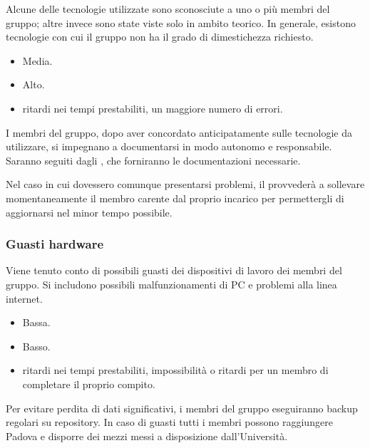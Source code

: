 \documentclass[a4paper, titlepage]{article}
\begin{document}
	Alcune delle tecnologie utilizzate sono sconosciute a uno o più membri del gruppo; altre invece sono state viste solo in ambito teorico. In generale, esistono tecnologie con cui il gruppo non ha il grado di dimestichezza richiesto.
	
	\begin{itemize}
		\item {} Media.
		\item {} Alto.
		\item {} ritardi nei tempi prestabiliti, un maggiore numero di errori.
	\end{itemize}
	
	I membri del gruppo, dopo aver concordato anticipatamente sulle tecnologie da utilizzare, si impegnano a documentarsi in modo autonomo e responsabile. Saranno seguiti dagli , che forniranno le documentazioni necessarie.
	
	 Nel caso in cui dovessero comunque presentarsi problemi, il  provvederà a sollevare momentaneamente il membro carente dal proprio incarico per permettergli di aggiornarsi nel minor tempo possibile. 
	
	
	\subsubsection{Guasti hardware}
	Viene tenuto conto di possibili guasti dei dispositivi di lavoro dei membri del gruppo. Si includono possibili malfunzionamenti di PC e problemi alla linea internet.
	
	\begin{itemize}
		\item {} Bassa.
		\item {} Basso.
		\item {} ritardi nei tempi prestabiliti, impossibilità o ritardi per un membro di completare il proprio compito.
	\end{itemize}
	
	Per evitare perdita di dati significativi, i membri del gruppo eseguiranno backup regolari su repository. In caso di guasti tutti i membri possono raggiungere Padova e disporre dei mezzi messi a disposizione dall'Università.
	
\end{document}
